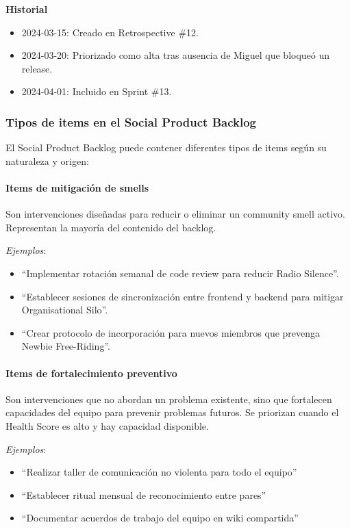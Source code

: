 \begin{protocolo}
    \medskip
    \textbf{Historial}
    \begin{itemize}
        \item 2024-03-15: Creado en Retrospective \#12.
        \item 2024-03-20: Priorizado como alta tras ausencia de Miguel que bloqueó un release.
        \item 2024-04-01: Incluido en Sprint \#13.
    \end{itemize}
\end{protocolo}


\subsubsection{Tipos de items en el Social Product Backlog}

El Social Product Backlog puede contener diferentes tipos de items según su naturaleza y origen:

\paragraph{Items de mitigación de smells}

Son intervenciones diseñadas para reducir o eliminar un community smell activo. Representan la mayoría del contenido del backlog.

\textit{Ejemplos}:
\begin{itemize}
    \item ``Implementar rotación semanal de code review para reducir Radio Silence''.
    \item ``Establecer sesiones de sincronización entre frontend y backend para mitigar Organisational Silo''.
    \item ``Crear protocolo de incorporación para nuevos miembros que prevenga Newbie Free-Riding''.
\end{itemize}

\paragraph{Items de fortalecimiento preventivo}

Son intervenciones que no abordan un problema existente, sino que fortalecen capacidades del equipo para prevenir problemas futuros. Se priorizan cuando el Health Score es alto y hay capacidad disponible.

\textit{Ejemplos}:
\begin{itemize}
    \item ``Realizar taller de comunicación no violenta para todo el equipo''
    \item ``Establecer ritual mensual de reconocimiento entre pares''
    \item ``Documentar acuerdos de trabajo del equipo en wiki compartida''
\end{itemize}

